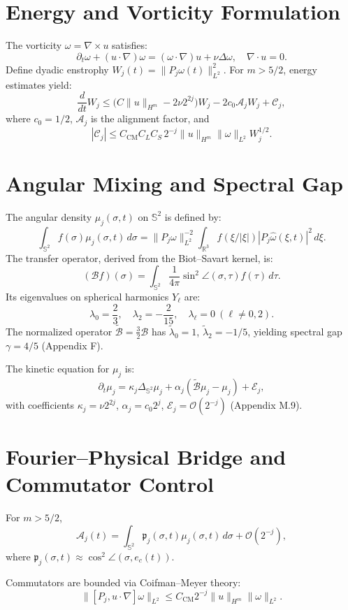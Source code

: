 \documentclass[11pt]{article}
\begin{document}
\section{Energy and Vorticity Formulation}
The vorticity $\omega = \nabla \times u$ satisfies:
\[
\partial_t \omega + (u \cdot \nabla) \omega = (\omega \cdot \nabla) u + \nu \Delta \omega, \quad \nabla \cdot u = 0.
\]
Define dyadic enstrophy $W_j(t) = \|P_j \omega(t)\|_{L^2}^2$. For $m > 5/2$, energy estimates yield:
\begin{equation}
\frac{d}{dt} W_j \leq \Big(C \|u\|_{H^m} - 2\nu 2^{2j}\Big) W_j - 2 c_0 \mathcal{A}_j W_j + \mathcal{C}_j,
\tag{2.9}
\end{equation}
where $c_0 = 1/2$, $\mathcal{A}_j$ is the alignment factor, and
\[
|\mathcal{C}_j| \leq C_{\text{CM}} C_L C_S \, 2^{-j} \|u\|_{H^m} \|\omega\|_{L^2} W_j^{1/2}.
\]

\section{Angular Mixing and Spectral Gap}
The angular density $\mu_j(\sigma,t)$ on $\mathbb{S}^2$ is defined by:
\[
\int_{\mathbb{S}^2} f(\sigma) \mu_j(\sigma,t) \, d\sigma = \|P_j \omega\|_{L^2}^{-2} \int_{\mathbb{R}^3} f(\xi/|\xi|) |P_j \hat{\omega}(\xi,t)|^2 \, d\xi.
\]
The transfer operator, derived from the Biot--Savart kernel, is:
\[
(\mathcal{B} f)(\sigma) = \int_{\mathbb{S}^2} \frac{1}{4\pi} \sin^2 \angle(\sigma,\tau) f(\tau) \, d\tau.
\]
Its eigenvalues on spherical harmonics $Y_\ell$ are:
\[
\lambda_0 = \frac{2}{3}, \quad \lambda_2 = -\frac{2}{15}, \quad \lambda_\ell = 0 \ (\ell \neq 0,2).
\]
The normalized operator $\tilde{\mathcal{B}} = \frac{3}{2} \mathcal{B}$ has $\tilde{\lambda}_0 = 1$, $\tilde{\lambda}_2 = -1/5$, yielding spectral gap $\gamma = 4/5$ (Appendix F).

The kinetic equation for $\mu_j$ is:
\begin{equation}
\partial_t \mu_j = \kappa_j \Delta_{\mathbb{S}^2} \mu_j + \alpha_j (\tilde{\mathcal{B}} \mu_j - \mu_j) + \mathcal{E}_j,
\tag{3.16}
\end{equation}
with coefficients $\kappa_j = \nu 2^{2j}$, $\alpha_j = c_0 2^j$, $\mathcal{E}_j = \mathcal{O}(2^{-j})$ (Appendix M.9).

\section{Fourier--Physical Bridge and Commutator Control}
\begin{lemma}
For $ m > 5/2 $,
\[
\mathcal{A}_j(t) = \int_{\mathbb{S}^2} \mathfrak{p}_j(\sigma,t) \mu_j(\sigma,t) \, d\sigma + \mathcal{O}(2^{-j}),
\tag{4.2}
\]
where $\mathfrak{p}_j(\sigma,t) \approx \cos^2 \angle(\sigma, e_c(t))$.
\end{lemma}
Commutators are bounded via Coifman--Meyer theory:
\[
\|[P_j, u \cdot \nabla] \omega\|_{L^2} \leq C_{\text{CM}} 2^{-j} \|u\|_{H^m} \|\omega\|_{L^2}.
\]
\end{document}
